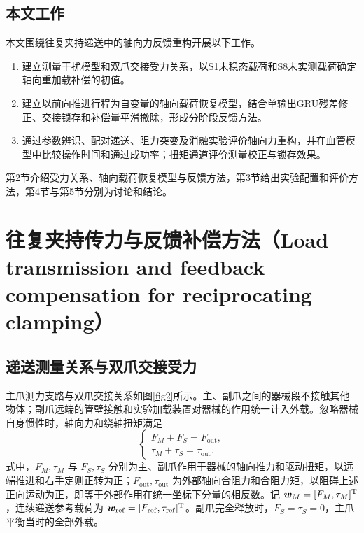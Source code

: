 \documentclass{JQRnew}
\providecommand{\RevisionColor}{\color{black}}
\newcommand{\revbegin}{\begingroup\RevisionColor}
\newcommand{\revend}{\par\endgroup}
\begin{document}
\subsection{本文工作}

\revbegin
本文围绕往复夹持递送中的轴向力反馈重构开展以下工作。
\begin{enumerate}[label=\arabic*),nosep,itemsep=0pt,topsep=2pt,partopsep=0pt,parsep=0pt,leftmargin=2\ccwd]
\item 建立测量干扰模型和双爪交接受力关系，以S1末稳态载荷和S8末实测载荷确定轴向重加载补偿的初值。
\item 建立以前向推进行程为自变量的轴向载荷恢复模型，结合单输出GRU残差修正、交接锁存和补偿量平滑撤除，形成分阶段反馈方法。
\item 通过参数辨识、配对递送、阻力突变及消融实验评价轴向力重构，并在血管模型中比较操作时间和通过成功率；扭矩通道评价测量校正与锁存效果。
\end{enumerate}
\revend

\revbegin
第2节介绍受力关系、轴向载荷恢复模型与反馈方法，第3节给出实验配置和评价方法，第4节与第5节分别为讨论和结论。
\revend

\revbegin
\section{往复夹持传力与反馈补偿方法（Load transmission and feedback compensation for reciprocating clamping）}
\revend

\subsection{递送测量关系与双爪交接受力}

\revbegin
主爪测力支路与双爪交接关系如图\ref{fig2}所示。主、副爪之间的器械段不接触其他物体；副爪远端的管壁接触和实验加载装置对器械的作用统一计入外载。忽略器械自身惯性时，轴向力和绕轴扭矩满足
\begin{equation}
\label{eq:balance}
\begin{cases}
F_M+F_S=F_{\mathrm{out}},\\
\tau_M+\tau_S=\tau_{\mathrm{out}}.
\end{cases}
\end{equation}
式中，$F_M,\tau_M$ 与 $F_S,\tau_S$ 分别为主、副爪作用于器械的轴向推力和驱动扭矩，以远端推进和右手定则正转为正；$F_{\mathrm{out}},\tau_{\mathrm{out}}$ 为外部轴向合阻力和合阻力矩，以阻碍上述正向运动为正，即等于外部作用在统一坐标下分量的相反数。记 $\bm w_M=[F_M,\tau_M]^{\rm T}$，连续递送参考载荷为 $\bm w_{\mathrm{ref}}=[F_{\mathrm{ref}},\tau_{\mathrm{ref}}]^{\rm T}$。副爪完全释放时，$F_S=\tau_S=0$，主爪平衡当时的全部外载。
\revend
\end{document}
